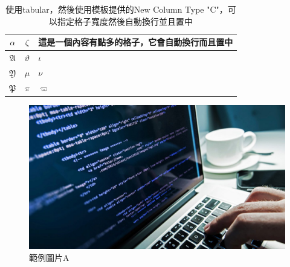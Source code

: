 \begin{table}[ht]
    \centering
    \renewcommand{\arraystretch}{1.2}

    \begin{tabular}{ c | c | C{10em}}
        $\alpha$        & $\zeta $     & 這是一個內容有點多的格子，它會自動換行而且置中 \\ \hline\hline
        $\mathfrak{A} $ & $\vartheta $ & $\iota $                                       \\\hline
        $\mathfrak{Y} $ & $\mu  $      & $\nu  $                                        \\\hline
        $\mathfrak{P} $ & $\pi  $      & $\varpi  $                                     \\\hline
    \end{tabular}

    \renewcommand{\arraystretch}{1}

    \caption{使用tabular，然後使用模板提供的New Column Type "C"，可以指定格子寬度然後自動換行並且置中}
    \label{tab:tabexample3}
\end{table}

\begin{figure}[hpbt]
    \centering
    \includegraphics[width=\textwidth]{Figures/computer_science.jpg}
    \caption{範例圖片A}
    \label{fig:figexample}
\end{figure}

